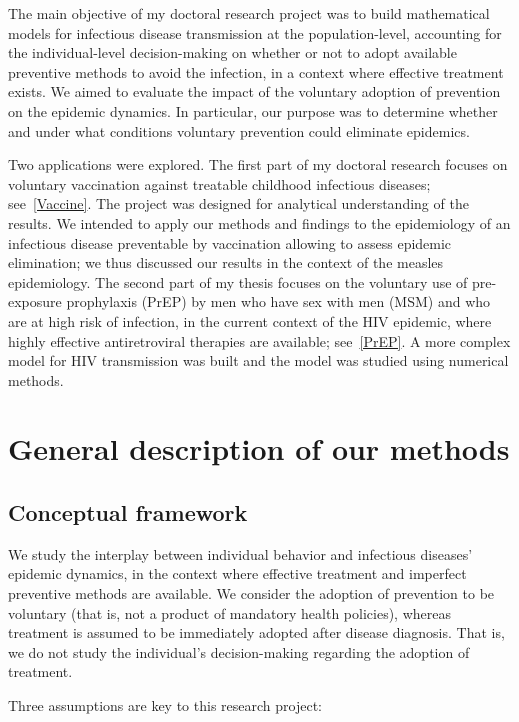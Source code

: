 The main objective of my doctoral research project was to build mathematical models for infectious disease transmission at the population-level, accounting for the individual-level decision-making on whether or not to adopt available preventive methods to avoid the infection, in a context where effective treatment exists. We aimed to evaluate the impact of the voluntary adoption of prevention on the epidemic dynamics. In particular, our purpose was to determine whether and under what conditions voluntary prevention could eliminate epidemics.

Two applications were explored. The first part of my doctoral research focuses on voluntary vaccination against treatable childhood infectious diseases; see~\autoref{Vaccine}. The project was designed for analytical understanding of the results. We intended to apply our methods and findings to the epidemiology of an infectious disease preventable by vaccination allowing to assess epidemic elimination; we thus discussed our results in the context of the measles epidemiology. The second part of my thesis focuses on the voluntary use of pre-exposure prophylaxis (PrEP) by men who have sex with men (MSM) and who are at high risk of infection, in the current context of the HIV epidemic, where highly effective antiretroviral therapies are available; see~\autoref{PrEP}. A more complex model for HIV transmission was built and the model was studied using numerical methods.



\section{General description of our methods}

\subsection{Conceptual framework}
\label{Intro:Framework} 

We study the interplay between individual behavior and infectious diseases' epidemic dynamics, in the context where effective treatment and imperfect preventive methods are available. We consider the adoption of prevention to be voluntary (that is, not a product of mandatory health policies), whereas treatment is assumed to be immediately adopted after disease diagnosis. That is, we do not study the individual's decision-making regarding the adoption of treatment. 

Three assumptions are key to this research project:

